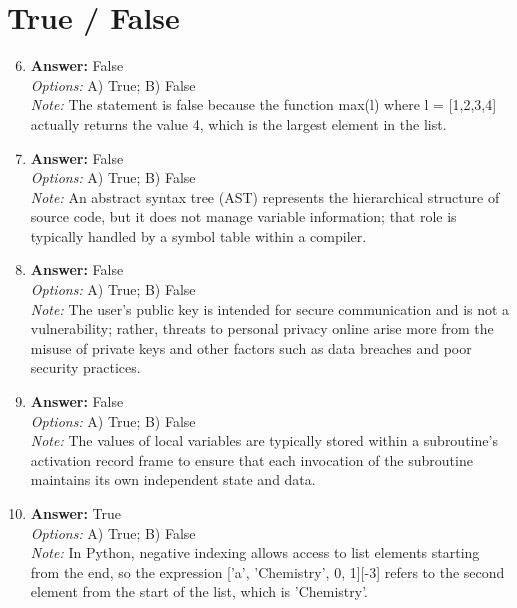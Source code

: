\documentclass[12pt]{article}
\begin{document}
\section*{True / False}
\begin{enumerate}[label=\arabic*.]
\setcounter{enumi}{5}
\item \textbf{Answer:} False
\\ \textit{Options:} A) True; B) False
\\ \textit{Note:} The statement is false because the function max(l) where l = [1,2,3,4] actually returns the value 4, which is the largest element in the list.
\item \textbf{Answer:} False
\\ \textit{Options:} A) True; B) False
\\ \textit{Note:} An abstract syntax tree (AST) represents the hierarchical structure of source code, but it does not manage variable information; that role is typically handled by a symbol table within a compiler.
\item \textbf{Answer:} False
\\ \textit{Options:} A) True; B) False
\\ \textit{Note:} The user's public key is intended for secure communication and is not a vulnerability; rather, threats to personal privacy online arise more from the misuse of private keys and other factors such as data breaches and poor security practices.
\item \textbf{Answer:} False
\\ \textit{Options:} A) True; B) False
\\ \textit{Note:} The values of local variables are typically stored within a subroutine's activation record frame to ensure that each invocation of the subroutine maintains its own independent state and data.
\item \textbf{Answer:} True
\\ \textit{Options:} A) True; B) False
\\ \textit{Note:} In Python, negative indexing allows access to list elements starting from the end, so the expression ['a', 'Chemistry', 0, 1][-3] refers to the second element from the start of the list, which is 'Chemistry'.
\end{enumerate}
\end{document}

